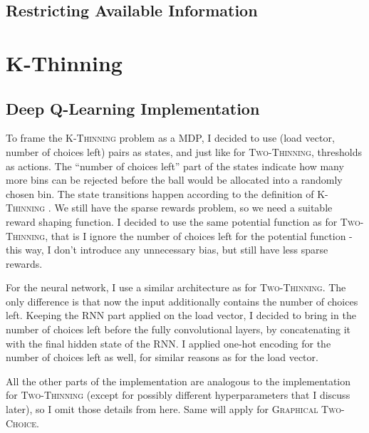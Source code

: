 \subsection{Restricting Available Information} \label{lesssharedstate}







\section{K-Thinning}


\subsection{Deep Q-Learning Implementation}


To frame the \textsc{K-Thinning} problem as a MDP, I decided to use (load vector, number of choices left) pairs as states, and just like for \textsc{Two-Thinning}, thresholds as actions. The ``number of choices left'' part of the states indicate how many more bins can be rejected before the ball would be allocated into a randomly chosen bin. The state transitions happen according to the definition of \textsc{K-Thinning} . We still have the sparse rewards problem, so we need a suitable reward shaping function. I decided to use the same potential function as for \textsc{Two-Thinning}, that is I ignore the number of choices left for the potential function - this way, I don't introduce any unnecessary bias, but still have less sparse rewards. 


For the neural network, I use a similar architecture as for \textsc{Two-Thinning}. The only difference is that now the input additionally contains the number of choices left. Keeping the RNN part applied on the load vector, I decided to bring in the number of choices left before the fully convolutional layers, by concatenating it with the final hidden state of the RNN. I applied one-hot encoding for the number of choices left as well, for similar reasons as for the load vector.


All the other parts of the implementation are analogous to the implementation for \textsc{Two-Thinning} (except for possibly different hyperparameters that I discuss later), so I omit those details from here. Same will apply for \textsc{Graphical Two-Choice}.



